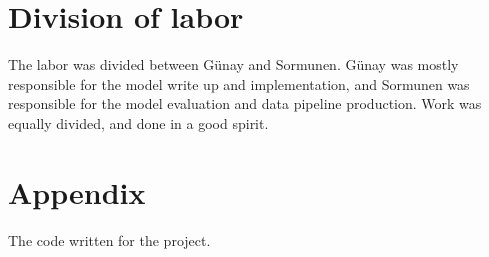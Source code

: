 \documentclass{article}
\begin{document}
\clearpage
\section{Division of labor}

The labor was divided between Günay and Sormunen. Günay was mostly responsible for the model write up and implementation, and Sormunen was responsible for the model evaluation and data pipeline production. Work was equally divided, and done in a good spirit. 



\clearpage
\section{Appendix}
The code written for the project. 

\end{document}

